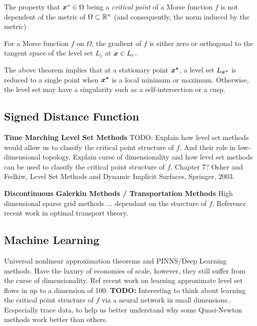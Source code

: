 \documentclass[10pt]{article}
\begin{document}
    \begin{remark}
        The property that $\bm{x}^* \in \Omega$ being a \emph{critical point} of a Morse function $f$ is
        not dependent of the metric of $\Omega \subset \mathbb{R}^n$ (and consequently, the norm induced by the metric)
    \end{remark}

    \begin{theorem}
        For a Morse function $f$ on $\Omega$, the gradient of $f$ is either zero or
        orthogonal to the tangent space of the level set $L_c$ at $\bm{x} \in L_c$.
    \end{theorem}

    The above theorem implies that at a stationary point $\bm{x^*}$, a
    level set $L_{\bm{x^*}}$ is reduced to a single point
    when $\bm{x^*}$ is a local minimum or maximum. 
    Otherwise, the level set may have a singularity
    such as a self-intersection or a cusp.

    \subsection*{Signed Distance Function}

    \textbf{Time Marching Level Set Methods}
        TODO: Explain how level set methods would allow us
        to classify the critical point structure of $f$.
        And their role in low-dimensional topology.
        Explain curse of dimensionality and how level set methods
        can be used to classify the critical point structure of $f$.
        Chapter 7? Osher and Fedkiw, Level Set Methods and Dynamic
        Implicit Surfaces, Springer, 2003.
    
    \textbf{Discontinuous Galerkin Methods / Transportation Methods}
        High dimensional sparse grid methods ... dependant on the sturcture
        of $f$. Reference recent work in optimal transport theory.

    \subsection{Machine Learning}
        Universal nonlinear approximation theorems and PINNS/Deep Learning
        methods. Have the luxury of economies of scale, however, they
        still suffer from the curse of dimensionality. Ref recent work
        on learning approximate level set flows in up to a dimension of 100.
        \textbf{TODO:} Interesting to think about learning the critical
        point structure of $f$ via a neural network in small dimensions..
        Ecspecially trace data, to help us better understand why some
        Quasi-Newton methods work better than others.
\end{document}
